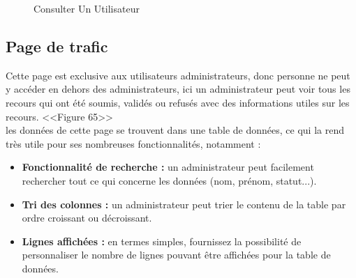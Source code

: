 \documentclass[12pt]{report}
\begin{document}
\begin{figure}[H]
\centering
\caption{Consulter Un Utilisateur}
  \vspace*{-0.1in}
\end{figure}

\newpage

\vspace*{-0.6in}
\subsection{Page de trafic}

Cette page est exclusive aux utilisateurs administrateurs, donc personne ne peut y accéder en dehors des administrateurs, ici un administrateur peut voir tous les recours qui ont été soumis, validés ou refusés avec des informations utiles sur les recours. <<Figure 65>>
\\
les données de cette page se trouvent dans une table de données, ce qui la rend très utile pour ses nombreuses fonctionnalités, notamment :

\begin{itemize}
  \item \textbf{Fonctionnalité de recherche :} un administrateur peut facilement rechercher tout ce qui concerne les données (nom, prénom, statut...).
  \item \textbf{Tri des colonnes :} un administrateur peut trier le contenu de la table par ordre croissant ou décroissant.
  \item \textbf{Lignes affichées :} en termes simples, fournissez la possibilité de personnaliser le nombre de lignes pouvant être affichées pour la table de données.
\end{itemize}
\end{document}
